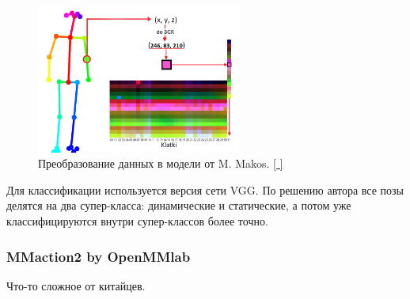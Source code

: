 \begin{figure}[h]
	\centering
	\includegraphics[width=0.6\textwidth]{./images/Classificators/MMakos_image_prep}
	\caption{Преобразование данных в модели от M. Makos. \href{https://raw.githubusercontent.com/mmakos/HPC/master/docimages/ephiSample.png}{[ ]}}
	\label{fig:mmakos_image_prep}
\end{figure}
\hspace{1cm}

Для классификации используется версия сети VGG. По решению автора все позы делятся на два супер-класса: динамические и статические, а потом уже классифицируются внутри супер-классов более точно.



\subsubsection{MMaction2 by OpenMMlab}
\label{subsubsec:mmaction2_desc}

Что-то сложное от китайцев.


\newpage